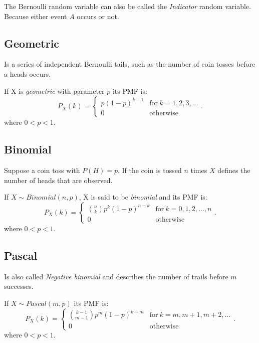 The Bernoulli random variable can also be called the \emph{Indicator} random variable.
Because either event $A$ occurs or not.

\subsection{Geometric}

Is a series of independent Bernoulli tails, such as the number of coin tosses before a heads occurs.

\begin{definition}
    If X is \emph{geometric} with parameter $p$ its PMF is: \[
        P_X(k) = \left\{
            \begin{array}{ll}
                p(1-p)^{k-1} & \mathrm{for} \: k = 1,2,3,... \\
                0 & \mathrm{otherwise}
            \end{array}
            \right.
    .\] 
    where $0 < p < 1$.
\end{definition}

\subsection{Binomial}

Suppose a coin toss with $P(H) = p$.
If the coin is tossed $n$ times $X$ defines the number of heads that are observed.

\begin{definition}
    If $X \sim Binomial(n,p)$, X is said to be \emph{binomial} and its PMF is: \[
        P_X(k) = \left\{
            \begin{array}{ll}
                \binom{n}{k} p^k (1 - p)^{n-k} & \mathrm{for} \: k = 0,1,2,...,n \\
                0 & \mathrm{otherwise}
            \end{array}
            \right.
    .\] 
    where $0 < p < 1$.
\end{definition}

\subsection{Pascal}

Is also called \emph{Negative binomial} and describes the number of trails before $m$ successes.

\begin{definition}
    If $X \sim Pascal(m,p)$ its PMF is: \[
        P_X(k) = \left\{
            \begin{array}{ll}
                \binom{k-1}{m-1} p^m (1-p)^{k-m} & \mathrm{for} \: k=m,m+1,m+2,... \\
                0 & \mathrm{otherwise}
            \end{array}
            \right.
    .\] 
    where $0 < p < 1$.
\end{definition}


